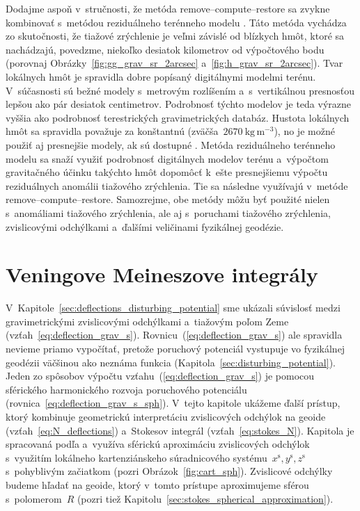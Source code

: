 \documentclass[a4paper, 12pt]{book}
\begin{document}
Dodajme aspoň v~stručnosti, že metóda remove--compute--restore sa zvykne 
kombinovať s~metódou reziduálneho terénneho modelu 
\parencite{Forsberg1981,Forsberg1984}.  Táto metóda vychádza zo skutočnosti, že 
tiažové zrýchlenie je veľmi závislé od blízkych hmôt, ktoré sa nachádzajú, 
povedzme, niekoľko desiatok kilometrov od výpočtového bodu (porovnaj 
Obrázky~\ref{fig:gg_grav_sr_2arcsec} a~\ref{fig:h_grav_sr_2arcsec}).  Tvar 
lokálnych hmôt je spravidla dobre popísaný digitálnymi modelmi terénu.  
V~súčasnosti sú bežné modely s~metrovým rozlíšením a~s~vertikálnou presnosťou 
lepšou ako pár desiatok centimetrov.  Podrobnosť týchto modelov je teda výrazne 
vyššia ako podrobnosť terestrických gravimetrických databáz.  Hustota lokálnych 
hmôt sa spravidla považuje za konštantnú (zväčša~$2670\ \mathrm{kg}\, 
\mathrm{m}^{-3}$), no je možné použiť aj presnejšie modely, ak sú dostupné 
\parencite[napríklad][]{Yang2018}.  Metóda reziduálneho terénneho modelu sa 
snaží využiť podrobnosť digitálnych modelov terénu a~výpočtom gravitačného 
účinku takýchto hmôt dopomôcť k~ešte presnejšiemu výpočtu reziduálnych anomálii 
tiažového zrýchlenia.  Tie sa následne využívajú v~metóde 
remove--compute--restore.  Samozrejme, obe metódy môžu byť použité nielen 
s~anomáliami tiažového zrýchlenia, ale aj s~poruchami tiažového zrýchlenia, 
zvislicovými odchýlkami a~ďalšími veličinami fyzikálnej geodézie.




\section{Veningove Meineszove integrály}
\label{sec:vm_integral}

V~Kapitole~\ref{sec:deflections_disturbing_potential} sme ukázali súvislosť 
medzi gravimetrickými zvislicovými odchýlkami a~tiažovým poľom Zeme 
(vzťah~\ref{eq:deflection_grav_s}).  Rovnicu~(\ref{eq:deflection_grav_s}) ale 
spravidla nevieme priamo vypočítať, pretože poruchový potenciál vystupuje vo 
fyzikálnej geodézii väčšinou ako neznáma funkcia 
(Kapitola~\ref{sec:disturbing_potential}).  Jeden zo spôsobov výpočtu 
vzťahu~(\ref{eq:deflection_grav_s}) je pomocou sférického harmonického rozvoja 
poruchového potenciálu (rovnica~\ref{eq:deflection_grav_s_sph}).  V~tejto 
kapitole ukážeme ďalší prístup, ktorý kombinuje geometrickú interpretáciu 
zvislicových odchýlok na geoide (vzťah~\ref{eq:N_deflections}) a~Stokesov 
integrál (vzťah~\ref{eq:stokes_N}).  Kapitola je spracovaná podľa 
\textcite{MoritzPhysicalGeodesy} a~využíva sférickú aproximáciu zvislicových 
odchýlok s~využitím lokálneho kartenziánskeho súradnicového 
systému~$x^\mathrm{s}, y^\mathrm{s}, z^\mathrm{s}$ s~pohyblivým začiatkom 
(pozri Obrázok~\ref{fig:cart_sph}).  Zvislicové odchýlky budeme hľadať na 
geoide, ktorý v~tomto prístupe aproximujeme sférou s~polomerom~$R$ (pozri tiež 
Kapitolu~\ref{sec:stokes_spherical_approximation}).
\end{document}
